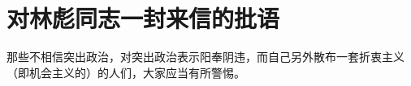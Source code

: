 \section[对林彪同志一封来信的批语（一九六五年十二月二日）]{对林彪同志一封来信的批语}


那些不相信突出政治，对突出政治表示阳奉阴违，而自己另外散布一套折衷主义（即机会主义的）的人们，大家应当有所警惕。

